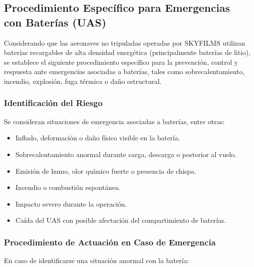 \subsection{Procedimiento Específico para Emergencias con Baterías (UAS)}
Considerando que las aeronaves no tripuladas operadas por SKYFILMS utilizan baterías recargables de alta densidad energética (principalmente baterías de litio), se establece el siguiente procedimiento específico para la prevención, control y respuesta ante emergencias asociadas a baterías, tales como sobrecalentamiento, incendio, explosión, fuga térmica o daño estructural.

\subsubsection{Identificación del Riesgo}
Se consideran situaciones de emergencia asociadas a baterías, entre otras:

\begin{itemize}
    \item Inflado, deformación o daño físico visible en la batería.

    \item Sobrecalentamiento anormal durante carga, descarga o posterior al vuelo.

    \item Emisión de humo, olor químico fuerte o presencia de chispa.

    \item Incendio o combustión espontánea.

    \item Impacto severo durante la operación.

    \item Caída del UAS con posible afectación del compartimiento de baterías.
\end{itemize}

\subsubsection{Procedimiento de Actuación en Caso de Emergencia}
En caso de identificarse una situación anormal con la batería:

